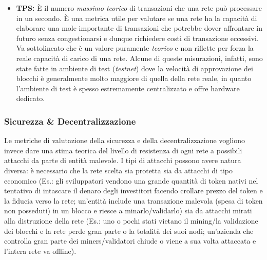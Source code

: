 \documentclass[a4paper, 12pt]{article}
\begin{document}
\begin{itemize}
\item \textbf{TPS: }
È il numero \textit{massimo teorico} di transazioni che una rete può processare in un secondo.
È una metrica utile per valutare se una rete ha la capacità di elaborare una mole importante di transazioni che potrebbe dover affrontare in futuro senza
congestionarsi e dunque richiedere costi di transazione eccessivi.
Va sottolineato che è un valore puramente \textit{teorico} e non riflette per forza la reale capacità di carico di una rete.
Alcune di queste misurazioni, infatti, sono state fatte in ambiente di test (\textit{testnet}) dove la velocità di approvazione dei blocchi è
generalmente molto maggiore di quella della rete reale, in quanto l'ambiente di test è spesso estremamente centralizzato e offre hardware dedicato.

\end{itemize}

\newpage

\subsubsection*{Sicurezza \& Decentralizzazione}
Le metriche di valutazione della sicurezza e della decentralizzazione vogliono invece dare una stima teorica del livello di resistenza di ogni rete a possibili attacchi da parte di entità
malevole. I tipi di attacchi possono avere natura diversa: è necessario che la rete scelta sia protetta sia da attacchi di tipo economico (Es.: gli sviluppatori vendono una grande quantità
di token nativi nel tentativo di intascare il denaro degli investitori facendo crollare prezzo del token e la fiducia verso la rete; un'entità include una transazione malevola (spesa
di token non posseduti) in un blocco e riesce a minarlo/validarlo) sia da attacchi mirati alla distruzione della rete (Es.: uno o pochi stati vietano il mining/la validazione dei blocchi
e la rete perde gran parte o la totalità dei suoi nodi; un'azienda che controlla gran parte dei miners/validatori chiude o viene a sua volta attaccata e l'intera rete va offline).
\end{document}
